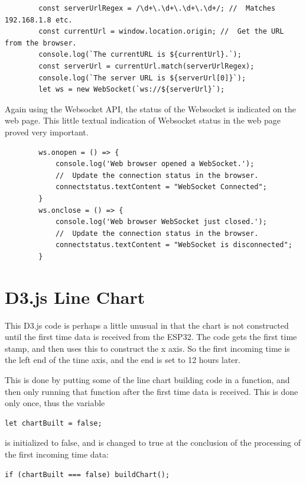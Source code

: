 \documentclass[oneside,letterpaper,12pt]{book}
\begin{document}
\begin{verbatim}
        const serverUrlRegex = /\d+\.\d+\.\d+\.\d+/; //  Matches 192.168.1.8 etc.
        const currentUrl = window.location.origin; //  Get the URL from the browser.
        console.log(`The currentURL is ${currentUrl}.`);
        const serverUrl = currentUrl.match(serverUrlRegex);
        console.log(`The server URL is ${serverUrl[0]}`);
        let ws = new WebSocket(`ws://${serverUrl}`);
\end{verbatim}

Again using the Websocket API, the status of the Websocket is indicated
on the web page. This little textual indication of Websocket status in
the web page proved very important.

\begin{verbatim}
        ws.onopen = () => {
            console.log('Web browser opened a WebSocket.');
            //  Update the connection status in the browser.
            connectstatus.textContent = "WebSocket Connected";
        }
        ws.onclose = () => {
            console.log('Web browser WebSocket just closed.');
            //  Update the connection status in the browser.
            connectstatus.textContent = "WebSocket is disconnected";
        }
\end{verbatim}

\section{D3.js Line Chart}\label{d3.js-line-chart}

This D3.js code is perhaps a little unusual in that the chart is not
constructed until the first time data is received from the ESP32. The
code gets the first time stamp, and then uses this to construct the x
axis. So the first incoming time is the left end of the time axis, and
the end is set to 12 hours later.

This is done by putting some of the line chart building code in a
function, and then only running that function after the first time data
is received. This is done only once, thus the variable

\begin{verbatim}
let chartBuilt = false;
\end{verbatim}

is initialized to false, and is changed to true at the conclusion of the
processing of the first incoming time data:

\begin{verbatim}
if (chartBuilt === false) buildChart();
\end{verbatim}
\end{document}

